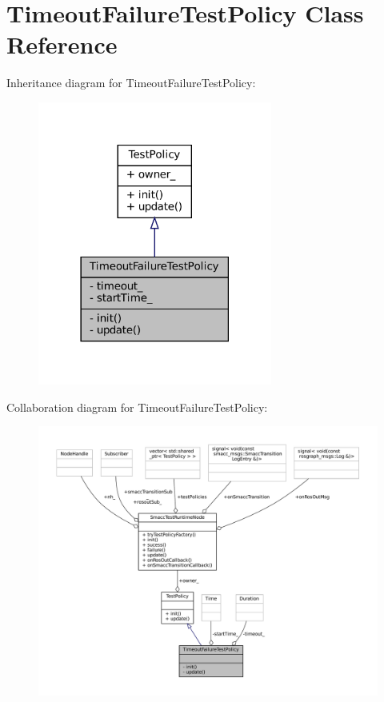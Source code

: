 \hypertarget{classTimeoutFailureTestPolicy}{}\section{Timeout\+Failure\+Test\+Policy Class Reference}
\label{classTimeoutFailureTestPolicy}


Inheritance diagram for Timeout\+Failure\+Test\+Policy\+:
\nopagebreak
\begin{figure}[H]
\begin{center}
\leavevmode
\includegraphics[width=218pt]{classTimeoutFailureTestPolicy__inherit__graph}
\end{center}
\end{figure}


Collaboration diagram for Timeout\+Failure\+Test\+Policy\+:
\nopagebreak
\begin{figure}[H]
\begin{center}
\leavevmode
\includegraphics[width=350pt]{classTimeoutFailureTestPolicy__coll__graph}
\end{center}
\end{figure}
